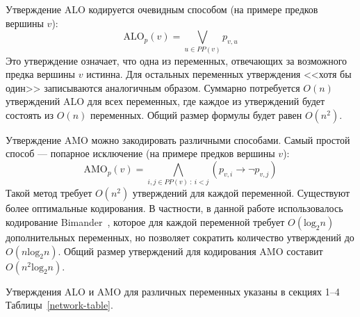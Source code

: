 Утверждение ALO кодируется очевидным способом (на примере предков вершины $v$):
$$\mathrm{ALO}_p(v) = \bigvee\limits_{u \in PP(v)} p_{v,u}$$
Это утверждение означает, что одна из переменных, отвечающих за возможного предка вершины $v$ истинна.
Для остальных переменных утверждения <<хотя бы один>> записываются аналогичным образом.
Суммарно потребуется $O(n)$ утверждений ALO для всех переменных, где каждое из утверждений будет состоять из $O(n)$ переменных.
Общий размер формулы будет равен $O(n^2)$.

Утверждение AMO можно закодировать различными способами.
Самый простой способ --- попарное исключение (на примере предков вершины $v$):
$$\mathrm{AMO}_p(v) = \bigwedge\limits_{i, j \in PP(v)~:~i < j} \left(p_{v,i} \rightarrow \neg p_{v,j}\right)$$
Такой метод требует $O(n^2)$ утверждений для каждой переменной. 
Существуют более оптимальные кодирования.
В частности, в данной работе использовалось кодирование Bimander~\cite{nguyenefficient}, которое для каждой переменной требует $O(\mathrm{log}_2 n)$ дополнительных переменных, но позволяет сократить количество утверждений до $O(n \mathrm{log}_2 n)$.
Общий размер утверждений для кодирования AMO составит $O(n^2 \mathrm{log}_2 n)$.

Утверждения ALO и AMO для различных переменных указаны в секциях 1--4 Таблицы~\ref{network-table}.


